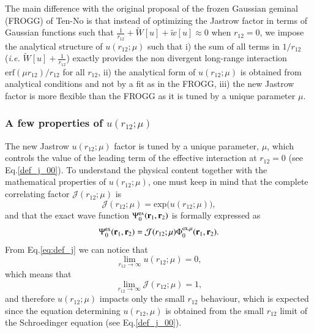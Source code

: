 \documentclass[aip,jcp,reprint,noshowkeys,superscriptaddress]{revtex4-1}
\newcommand{\br}[0]{{\bf {r}}}
\newcommand{\psiex}[0]{\Psi^{\text{ex}}_0}
\newcommand{\phimu}[0]{\Phi^{\text{ex},\mu}_0}
\begin{document}
The main difference with the original proposal of the frozen Gaussian geminal (FROGG) of Ten-No\cite{TenNo-CPL-00-a} is that instead of optimizing the Jastrow factor in terms of Gaussian functions such that $\frac{1}{r_{12}}  + \tilde{W}[u] + \tilde{w}[u] \approx 0$ when $r_{12}=0$, 
we impose the analytical structure of $u(r_{12};\mu)$ such that i) the sum of all terms in $1/r_{12}$ (\textit{i.e.} $\tilde{W}[u] + \frac{1}{r_{12}}$) exactly provides the non divergent long-range interaction $\text{erf}(\mu r_{12})/r_{12}$ for all $r_{12}$, 
ii) the analytical form of $u(r_{12};\mu)$ is obtained from analytical conditions and not by a fit as in the FROGG,  
iii) the new Jastrow factor is more flexible than the FROGG as it is tuned by a unique parameter $\mu$.  

\subsubsection{A few properties of $u(r_{12};\mu)$}
The new Jastrow $u(r_{12};\mu)$ factor is tuned by a unique parameter, $\mu$, which controls the value of the leading term of the effective interaction at $r_{12}=0$ (see Eq.\eqref{def_j_00}). 
To understand the physical content together with the mathematical properties of $u(r_{12};\mu)$, 
one must keep in mind that the complete correlating factor $\mathcal{J}(r_{12};\mu)$ is 
\begin{equation}
 \mathcal{J}(r_{12};\mu) = \text{exp}\big(u(r_{12};\mu)\big),
\end{equation}
and that the exact wave function $\psiex(\br{}_1,\br{}_2)$ is formally expressed as 
\begin{equation}
 \psiex(\br{}_1,\br{}_2) = \mathcal{J}(r_{12};\mu) \phimu(\br{}_{1},\br{}_{2}).  
\end{equation}
From Eq.\eqref{eq:def_j} we can notice that 
\begin{equation}
 \lim_{r_{12} \rightarrow \infty}u(r_{12};\mu) = 0,
\end{equation}
which means that 
\begin{equation}
 \lim_{r_{12} \rightarrow \infty}\mathcal{J}(r_{12};\mu) = 1,
\end{equation}
and therefore $u(r_{12};\mu)$ impacts only the small $r_{12}$ behaviour,  
which is expected since the equation determining $u(r_{12},\mu)$ is obtained from the small $r_{12}$ limit of the Schroedinger equation (see Eq.\eqref{def_j_00}). 
\end{document}
